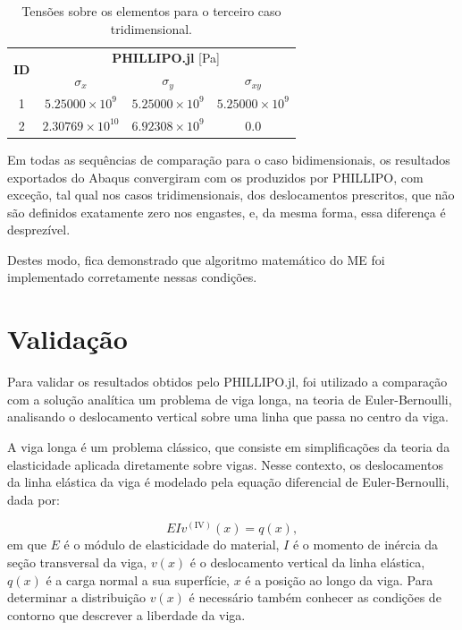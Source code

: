 \begin{table}
    \centering
    \caption{Tensões sobre os elementos para o terceiro caso tridimensional.}
    \begin{tabular}{c | c c c}
        \toprule
        \multirow{2}{*}{\textbf{ID}} & \multicolumn{3}{c}{\textbf{PHILLIPO.jl} [Pa]}  \\
                                           & \textbf{$\sigma_x$} & \textbf{$\sigma_y$} & \textbf{$\sigma_{xy}$} \\                            
        \midrule
        1 & $5.25000\times10^{9}$ & $5.25000\times10^{9}$ & $5.25000\times10^{9}$ \\
        2 & $2.30769\times10^{10}$ & $6.92308\times10^{9}$ & $0.0$ \\
        \bottomrule
    \end{tabular}
    \label{tab:verificacao_quadrado_3_tensoes}
\end{table}


Em todas as sequências de comparação para o caso bidimensionais, os resultados exportados do Abaqus convergiram com os produzidos por PHILLIPO, com exceção, tal qual nos casos tridimensionais, dos deslocamentos prescritos, que não são definidos exatamente zero nos engastes, e, da mesma forma, essa diferença é desprezível.

Destes modo, fica demonstrado que algoritmo matemático do ME foi implementado corretamente nessas condições. 

\section{Validação}

Para validar os resultados obtidos pelo PHILLIPO.jl, foi utilizado a comparação com a solução analítica um problema de viga longa, na teoria de Euler-Bernoulli, analisando o deslocamento vertical sobre uma linha que passa no centro da viga.

A viga longa é um problema clássico, que consiste em simplificações da teoria da elasticidade aplicada diretamente sobre vigas. Nesse contexto, os deslocamentos da linha elástica da viga é modelado pela equação diferencial de Euler-Bernoulli, dada por:

\begin{equation}
    EI v^{(\text{IV})}(x) = q(x),
\end{equation}
em que $E$ é o módulo de elasticidade do material, $I$ é o momento de inércia da seção transversal da viga, $v(x)$ é o deslocamento vertical da linha elástica, $q(x)$ é a carga normal a sua superfície, $x$ é a posição ao longo da viga. Para determinar a distribuição $v(x)$ é necessário também conhecer as condições de contorno que descrever a liberdade da viga. \cite{Hibbeler}

